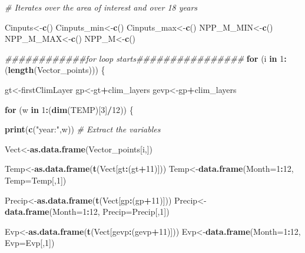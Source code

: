 \documentclass[
  10pt,
  b5paper,
]{book}
\newenvironment{Shaded}{\begin{snugshade}}{\end{snugshade}}
\newcommand{\CommentTok}[1]{\textcolor[rgb]{0.56,0.35,0.01}{\textit{#1}}}
\newcommand{\ControlFlowTok}[1]{\textcolor[rgb]{0.13,0.29,0.53}{\textbf{#1}}}
\newcommand{\DataTypeTok}[1]{\textcolor[rgb]{0.13,0.29,0.53}{#1}}
\newcommand{\DecValTok}[1]{\textcolor[rgb]{0.00,0.00,0.81}{#1}}
\newcommand{\KeywordTok}[1]{\textcolor[rgb]{0.13,0.29,0.53}{\textbf{#1}}}
\newcommand{\NormalTok}[1]{#1}
\newcommand{\OperatorTok}[1]{\textcolor[rgb]{0.81,0.36,0.00}{\textbf{#1}}}
\newcommand{\StringTok}[1]{\textcolor[rgb]{0.31,0.60,0.02}{#1}}
\begin{document}
\begin{Shaded}
\begin{Highlighting}[]
\CommentTok{# Iterates over the area of interest and over 18 years }

\NormalTok{Cinputs<-}\KeywordTok{c}\NormalTok{()}
\NormalTok{Cinputs_min<-}\KeywordTok{c}\NormalTok{()}
\NormalTok{Cinputs_max<-}\KeywordTok{c}\NormalTok{()}
\NormalTok{NPP_M_MIN<-}\KeywordTok{c}\NormalTok{()}
\NormalTok{NPP_M_MAX<-}\KeywordTok{c}\NormalTok{()}
\NormalTok{NPP_M<-}\KeywordTok{c}\NormalTok{()}

\CommentTok{############for loop starts################}
\ControlFlowTok{for}\NormalTok{ (i }\ControlFlowTok{in} \DecValTok{1}\OperatorTok{:}\NormalTok{(}\KeywordTok{length}\NormalTok{(Vector_points))) \{}

\NormalTok{gt<-firstClimLayer}
\NormalTok{gp<-gt}\OperatorTok{+}\NormalTok{clim_layers}
\NormalTok{gevp<-gp}\OperatorTok{+}\NormalTok{clim_layers}

\ControlFlowTok{for}\NormalTok{ (w }\ControlFlowTok{in} \DecValTok{1}\OperatorTok{:}\NormalTok{(}\KeywordTok{dim}\NormalTok{(TEMP)[}\DecValTok{3}\NormalTok{]}\OperatorTok{/}\DecValTok{12}\NormalTok{)) \{}

\KeywordTok{print}\NormalTok{(}\KeywordTok{c}\NormalTok{(}\StringTok{"year:"}\NormalTok{,w))}
\CommentTok{# Extract the variables }

\NormalTok{Vect<-}\KeywordTok{as.data.frame}\NormalTok{(Vector_points[i,])}

\NormalTok{Temp<-}\KeywordTok{as.data.frame}\NormalTok{(}\KeywordTok{t}\NormalTok{(Vect[gt}\OperatorTok{:}\NormalTok{(gt}\OperatorTok{+}\DecValTok{11}\NormalTok{)]))}
\NormalTok{Temp<-}\KeywordTok{data.frame}\NormalTok{(}\DataTypeTok{Month=}\DecValTok{1}\OperatorTok{:}\DecValTok{12}\NormalTok{, }\DataTypeTok{Temp=}\NormalTok{Temp[,}\DecValTok{1}\NormalTok{])}

\NormalTok{Precip<-}\KeywordTok{as.data.frame}\NormalTok{(}\KeywordTok{t}\NormalTok{(Vect[gp}\OperatorTok{:}\NormalTok{(gp}\OperatorTok{+}\DecValTok{11}\NormalTok{)]))}
\NormalTok{Precip<-}\KeywordTok{data.frame}\NormalTok{(}\DataTypeTok{Month=}\DecValTok{1}\OperatorTok{:}\DecValTok{12}\NormalTok{, }\DataTypeTok{Precip=}\NormalTok{Precip[,}\DecValTok{1}\NormalTok{])}

\NormalTok{Evp<-}\KeywordTok{as.data.frame}\NormalTok{(}\KeywordTok{t}\NormalTok{(Vect[gevp}\OperatorTok{:}\NormalTok{(gevp}\OperatorTok{+}\DecValTok{11}\NormalTok{)]))}
\NormalTok{Evp<-}\KeywordTok{data.frame}\NormalTok{(}\DataTypeTok{Month=}\DecValTok{1}\OperatorTok{:}\DecValTok{12}\NormalTok{, }\DataTypeTok{Evp=}\NormalTok{Evp[,}\DecValTok{1}\NormalTok{])}
	

\end{Highlighting}
\end{Shaded}
\end{document}
